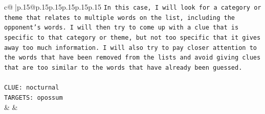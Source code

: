\documentclass{article}
\begin{document}
{\begin{supertabular}{c@{$\;$}|p{.15\linewidth}@{}p{.15\linewidth}p{.15\linewidth}p{.15\linewidth}p{.15\linewidth}p{.15\linewidth}}
{{{\texttt{In this case, I will look for a category or theme that relates to multiple words on the list, including the opponent's words. I will then try to come up with a clue that is specific to that category or theme, but not too specific that it gives away too much information. I will also try to pay closer attention to the words that have been removed from the lists and avoid giving clues that are too similar to the words that have already been guessed.} \\
\\ 
\texttt{CLUE: nocturnal} \\
\texttt{TARGETS: opossum} \\
            }
        }
    }
    & & \\ \\

\end{supertabular}
}
\end{document}
